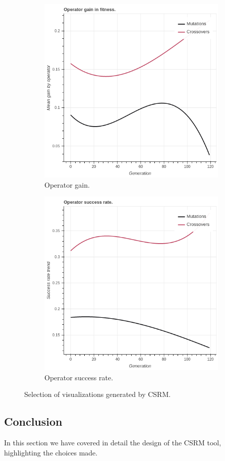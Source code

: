 \begin{figure}
\begin{subfigure}{0.5\textwidth}
    \centering
        \includegraphics[width=0.8\linewidth]{figures/viz_operatorgaintrend.png}
        \caption{Operator gain.}
    \end{subfigure}%
    \begin{subfigure}{0.5\textwidth}
    \centering
        \includegraphics[width=0.8\linewidth]{figures/viz_operatorsuccessratetrend.png}
        \caption{Operator success rate.}
    \end{subfigure}
    \caption{Selection of visualizations generated by CSRM.}
    \label{fig:viz}
    \end{figure}

\subsection{Conclusion}
In this section we have covered in detail the design of the CSRM tool, highlighting the choices made. 
% 
